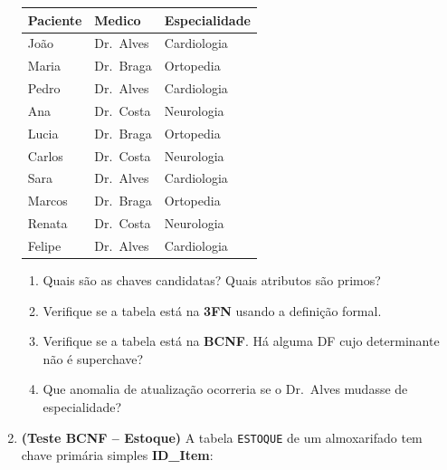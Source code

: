 \documentclass[12pt]{article}
\begin{document}
\begin{enumerate}[label=\textbf{Questão \arabic*:}, leftmargin=*]
  \vspace{0.2cm}
  \centering
  \begin{tabular}{|l|l|l|}
    \hline
    \textbf{Paciente} & \textbf{Medico} & \textbf{Especialidade} \\ \hline
    João    & Dr.\ Alves  & Cardiologia    \\ \hline
    Maria   & Dr.\ Braga  & Ortopedia      \\ \hline
    Pedro   & Dr.\ Alves  & Cardiologia    \\ \hline
    Ana     & Dr.\ Costa  & Neurologia     \\ \hline
    Lucia   & Dr.\ Braga  & Ortopedia      \\ \hline
    Carlos  & Dr.\ Costa  & Neurologia     \\ \hline
    Sara    & Dr.\ Alves  & Cardiologia    \\ \hline
    Marcos  & Dr.\ Braga  & Ortopedia      \\ \hline
    Renata  & Dr.\ Costa  & Neurologia     \\ \hline
    Felipe  & Dr.\ Alves  & Cardiologia    \\ \hline
  \end{tabular}
  \flushleft
  \vspace{0.2cm}
  \begin{enumerate}[label=\alph*)]
    \item Quais são as chaves candidatas? Quais atributos são primos?
    \item Verifique se a tabela está na \textbf{3FN} usando a definição formal.
    \item Verifique se a tabela está na \textbf{BCNF}. Há alguma DF cujo determinante não é superchave?
    \item Que anomalia de atualização ocorreria se o Dr.\ Alves mudasse de especialidade?
  \end{enumerate}

  \vspace{0.4cm}

  \item \textbf{(Teste BCNF -- Estoque)} A tabela \texttt{ESTOQUE} de um almoxarifado tem chave primária simples \textbf{ID\_Item}:


\end{enumerate}
\end{document}
